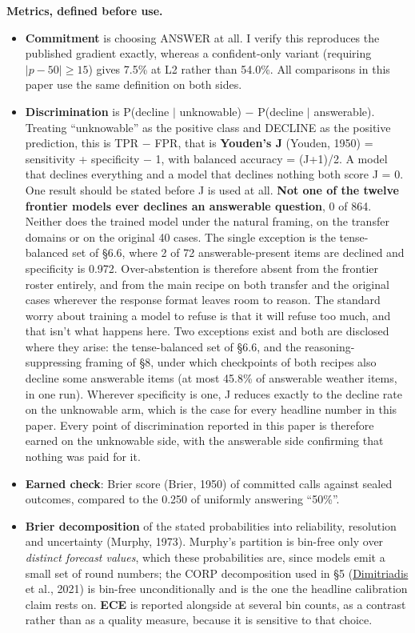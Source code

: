 \documentclass[10pt]{article}
\begin{document}
\textbf{Metrics, defined before use.}

\begin{itemize}[leftmargin=1.4em]
\item \textbf{Commitment} is choosing ANSWER at all. I verify this reproduces the published gradient exactly, whereas a confident-only variant (requiring $|p-50| \geq 15$) gives 7.5\% at L2 rather than 54.0\%. All comparisons in this paper use the same definition on both sides.
\item \textbf{Discrimination} is P(decline $\mid$ unknowable) $-$ P(decline $\mid$ answerable). Treating ``unknowable'' as the positive class and DECLINE as the positive prediction, this is TPR $-$ FPR, that is \textbf{Youden's J} (Youden, 1950) = sensitivity + specificity $-$ 1, with balanced accuracy = (J+1)/2. A model that declines everything and a model that declines nothing both score J = 0. One result should be stated before J is used at all. \textbf{Not one of the twelve frontier models ever declines an answerable question}, 0 of 864. Neither does the trained model under the natural framing, on the transfer domains or on the original 40 cases. The single exception is the tense-balanced set of \S6.6, where 2 of 72 answerable-present items are declined and specificity is 0.972. Over-abstention is therefore absent from the frontier roster entirely, and from the main recipe on both transfer and the original cases wherever the response format leaves room to reason. The standard worry about training a model to refuse is that it will refuse too much, and that isn't what happens here. Two exceptions exist and both are disclosed where they arise: the tense-balanced set of \S6.6, and the reasoning-suppressing framing of \S8, under which checkpoints of both recipes also decline some answerable items (at most 45.8\% of answerable weather items, in one run). Wherever specificity is one, J reduces exactly to the decline rate on the unknowable arm, which is the case for every headline number in this paper. Every point of discrimination reported in this paper is therefore earned on the unknowable side, with the answerable side confirming that nothing was paid for it.
\item \textbf{Earned check}: Brier score (Brier, 1950) of committed calls against sealed outcomes, compared to the 0.250 of uniformly answering ``50\%''.
\item \textbf{Brier decomposition} of the stated probabilities into reliability, resolution and uncertainty (Murphy, 1973). Murphy's partition is bin-free only over \textit{distinct forecast values}, which these probabilities are, since models emit a small set of round numbers; the CORP decomposition used in \S5 (\href{https://doi.org/10.1073/pnas.2016191118}{Dimitriadis} et al., 2021) is bin-free unconditionally and is the one the headline calibration claim rests on. \textbf{ECE} is reported alongside at several bin counts, as a contrast rather than as a quality measure, because it is sensitive to that choice.

\end{itemize}
\end{document}
